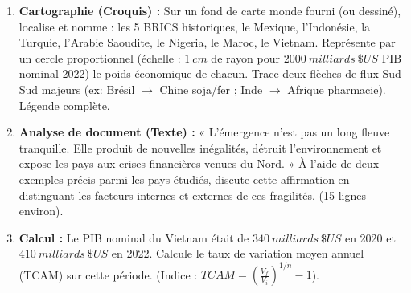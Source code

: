 \documentclass[11pt]{article}
\begin{document}
\begin{exercice}
\begin{enumerate}
\item \textbf{Cartographie (Croquis) :} Sur un fond de carte monde fourni (ou dessiné), localise et nomme : les 5 BRICS historiques, le Mexique, l'Indonésie, la Turquie, l'Arabie Saoudite, le Nigeria, le Maroc, le Vietnam. Représente par un cercle proportionnel (échelle : $\SI{1}{cm}$ de rayon pour $\SI{2000}{milliards}\ \$US$ PIB nominal 2022) le poids économique de chacun. Trace deux flèches de flux Sud-Sud majeurs (ex: Brésil $\to$ Chine soja/fer ; Inde $\to$ Afrique pharmacie). Légende complète.
\item \textbf{Analyse de document (Texte) :} « L'émergence n'est pas un long fleuve tranquille. Elle produit de nouvelles inégalités, détruit l'environnement et expose les pays aux crises financières venues du Nord. » À l'aide de deux exemples précis parmi les pays étudiés, discute cette affirmation en distinguant les facteurs internes et externes de ces fragilités. (15 lignes environ).
\item \textbf{Calcul :} Le PIB nominal du Vietnam était de $\SI{340}{milliards}\ \$US$ en 2020 et $\SI{410}{milliards}\ \$US$ en 2022. Calcule le taux de variation moyen annuel (TCAM) sur cette période. (Indice : $TCAM = \left(\frac{V_f}{V_i}\right)^{1/n} - 1$).
\end{enumerate}
\end{exercice}
\end{document}
